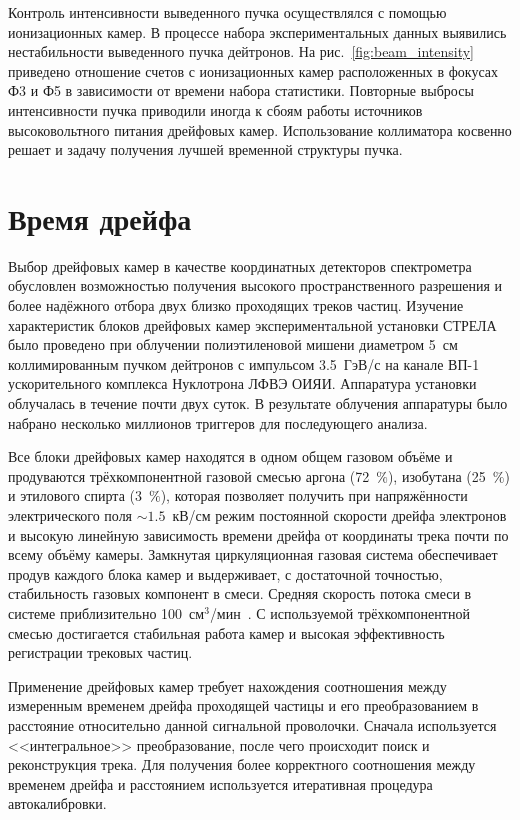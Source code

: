 Контроль интенсивности выведенного пучка осуществлялся с помощью ионизационных
камер. В процессе набора экспериментальных данных выявились нестабильности
выведенного пучка дейтронов. На рис.~\ref{fig:beam_intensity} приведено
отношение счетов с ионизационных камер расположенных в фокусах Ф3 и Ф5 в
зависимости от времени набора статистики. Повторные выбросы интенсивности пучка
приводили иногда к сбоям работы источников высоковольтного питания дрейфовых
камер. Использование коллиматора косвенно решает и задачу получения лучшей
временной структуры пучка.

\section{Время дрейфа}
Выбор дрейфовых камер в качестве координатных детекторов спектрометра обусловлен
возможностью получения высокого пространственного разрешения и более надёжного
отбора двух близко проходящих треков частиц. Изучение характеристик блоков
дрейфовых камер экспериментальной установки СТРЕЛА было проведено при облучении
полиэтиленовой мишени диаметром 5~см коллимированным пучком дейтронов с
импульсом 3.5~ГэВ/с на канале ВП-1 ускорительного комплекса Нуклотрона ЛФВЭ
ОИЯИ. Аппаратура установки облучалась в течение почти двух суток. В результате
облучения аппаратуры было набрано несколько миллионов триггеров для последующего
анализа.

Все блоки дрейфовых камер находятся в одном общем газовом объёме и продуваются
трёхкомпонентной газовой смесью аргона (72~$\%$), изобутана (25~$\%$) и
этилового спирта (3~$\%$), которая позволяет получить при напряжённости
электрического поля $\sim 1.5$~кВ/см режим постоянной скорости дрейфа
электронов и высокую линейную зависимость времени дрейфа от координаты трека
почти по всему объёму камеры. Замкнутая циркуляционная газовая система
обеспечивает продув каждого блока камер и выдерживает, с достаточной точностью,
стабильность газовых компонент в смеси. Средняя скорость потока смеси в системе
приблизительно 100~см$^{3}$/мин~\cite{filatova77}. С используемой
трёхкомпонентной смесью достигается стабильная работа камер и высокая
эффективность регистрации трековых частиц.

Применение дрейфовых камер требует нахождения соотношения между измеренным
временем дрейфа проходящей частицы и его преобразованием в расстояние
относительно данной сигнальной проволочки. Сначала используется <<интегральное>>
преобразование, после чего происходит поиск и реконструкция трека. Для получения
более корректного соотношения между временем дрейфа и расстоянием используется
итеративная процедура автокалибровки.

